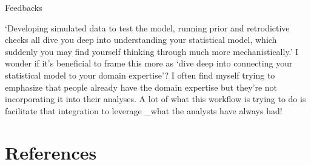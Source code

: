 \documentclass[11pt]{article}
\begin{document}
Feedbacks 

`Developing simulated data to test the model, running prior and retrodictive checks all dive you deep into understanding
your statistical model, which suddenly you may find yourself thinking through much more mechanistically.' I wonder if
it's beneficial to frame this more as `dive deep into connecting your statistical model to your domain expertise'?  I
often find myself trying to emphasize that people already have the domain expertise but they're not incorporating it into
their analyses.  A lot of what this workflow is trying to do is facilitate that integration to leverage _what the analysts
have always had!

\section{References}
\vspace{-5ex}

\end{document}
